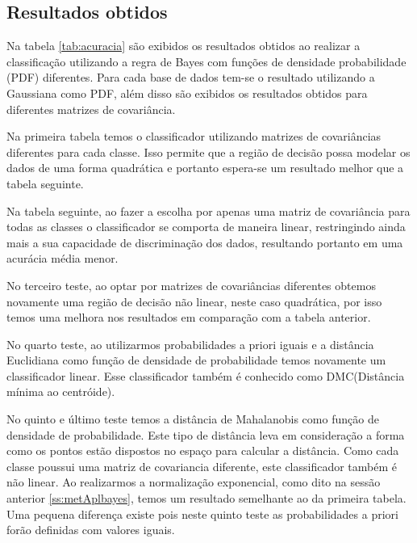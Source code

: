 \documentclass[ 
	article,			%
	11pt,				%
	oneside,			%
	a4paper,			%
	english,			%
	brazil,				%
	]{abntex2}
\begin{document}
\subsection{Resultados obtidos}
\label{ss:resultadosObtidos}

Na tabela \ref{tab:acuracia} são exibidos os resultados obtidos ao realizar a
classificação utilizando a regra de Bayes com funções de densidade probabilidade
(PDF) diferentes. Para cada base de dados tem-se o resultado utilizando a
Gaussiana como PDF, além disso são exibidos os resultados obtidos para
diferentes matrizes de covariância.

Na primeira tabela temos o classificador utilizando matrizes de covariâncias
diferentes para cada classe. Isso permite que a região de decisão possa modelar
os dados de uma forma quadrática e portanto espera-se um resultado melhor que a
tabela seguinte.

Na tabela seguinte, ao fazer a escolha por apenas uma matriz de covariância para
todas as classes o classificador se comporta de maneira linear, restringindo
ainda mais a sua capacidade de discriminação dos dados, resultando portanto em
uma acurácia média menor.

No terceiro teste, ao optar por matrizes de covariâncias diferentes obtemos
novamente uma região de decisão não linear, neste caso quadrática, por isso
temos uma melhora nos resultados em comparação com a tabela anterior.

No quarto teste, ao utilizarmos probabilidades a priori iguais e a distância
Euclidiana como função de densidade de probabilidade temos novamente um
classificador linear. Esse classificador também é conhecido como DMC(Distância
mínima ao centróide).

No quinto e último teste temos a distância de Mahalanobis como função de
densidade de probabilidade. Este tipo de distância leva em consideração a forma
como os pontos estão dispostos no espaço para calcular a distância. Como cada
classe poussui uma matriz de covariancia diferente, este classificador também é
não linear. Ao realizarmos a normalização exponencial, como dito na sessão
anterior \ref{ss:metAplbayes}, temos um resultado semelhante ao da primeira
tabela. Uma pequena diferença existe pois neste quinto teste as probabilidades a
priori forão definidas com valores iguais.
\end{document}
